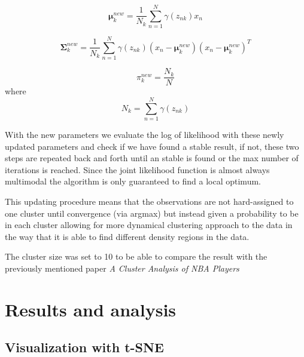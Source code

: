\documentclass{article}
\begin{document}
$$\mathbf{\mu}_k^{new} = \frac{1}{N_k} \sum_{n=1}^N\gamma(z_{nk})x_n$$

$$\mathbf{\Sigma}_k^{new} = \frac{1}{N_k} \sum_{n=1}^N\gamma(z_{nk})(x_n-\mathbf{\mu}_k^{new})(x_n-\mathbf{\mu}_k^{new})^T$$

$$ \pi_k^{new}= \frac{N_k}{N} $$ 
where
$$  N_k = \sum_{n=1}^N \gamma(z_{nk})$$

With the new parameters we evaluate the log of likelihood with these newly updated parameters and check if we have found a stable result, if not, these two steps are repeated back and forth until an stable is found or the max number of iterations is reached. Since the joint likelihood function is almost always multimodal the algorithm is only guaranteed to find a local optimum.

This updating procedure means that the observations are not hard-assigned to one cluster until convergence (via argmax) but instead given a probability to be in each cluster allowing for more dynamical clustering approach to the data in the way that it is able to find different density regions in the data.\cite{Bishop:2006:PRM:1162264}

The cluster size was set to 10 to be able to compare the result with the previously mentioned paper \textit{A Cluster Analysis of NBA Players}\cite{lutz2012cluster}





\newpage

\section{Results and analysis}

\subsection{Visualization with t-SNE}
\end{document}
